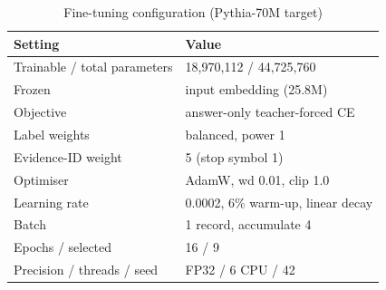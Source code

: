 \begin{table}[t]\centering\caption{Fine-tuning configuration (Pythia-70M target)}\label{tab:hparams}\footnotesize
\begin{tabular}{ll}
\hline
Setting & Value\\\hline
Trainable / total parameters & 18,970,112 / 44,725,760\\
Frozen & input embedding (25.8M)\\
Objective & answer-only teacher-forced CE\\
Label weights & balanced, power 1\\
Evidence-ID weight & 5 (stop symbol 1)\\
Optimiser & AdamW, wd 0.01, clip 1.0\\
Learning rate & 0.0002, 6\% warm-up, linear decay\\
Batch & 1 record, accumulate 4\\
Epochs / selected & 16 / 9\\
Precision / threads / seed & FP32 / 6 CPU / 42\\
\hline\end{tabular}
\end{table}

